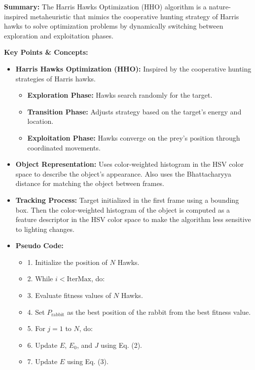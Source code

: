 \documentclass{article}
\begin{document}
\vspace{0.3cm}

\textbf{Summary:} The Harris Hawks Optimization (HHO) algorithm is a nature-inspired metaheuristic that mimics the cooperative hunting strategy of Harris hawks to solve optimization problems by dynamically switching between exploration and exploitation phases.

\vspace{0.3cm}

\textbf{Key Points \& Concepts:}
\begin{itemize}
  \item \textbf{Harris Hawks Optimization (HHO):} Inspired by the cooperative hunting strategies of Harris hawks.
    \begin{itemize}
      \item \textbf{Exploration Phase:} Hawks search randomly for the target.
      \item \textbf{Transition Phase:} Adjusts strategy based on the target's energy and location.
      \item \textbf{Exploitation Phase:} Hawks converge on the prey's position through coordinated movements.
    \end{itemize}
  \item \textbf{Object Representation:} Uses color-weighted histogram in the HSV color space to describe the object's appearance. Also uses the Bhattacharyya distance for matching the object between frames.
  \item \textbf{Tracking Process:} Target initialized in the first frame using a bounding box. Then the color-weighted histogram of the object is computed as a feature descriptor in the HSV color space to make the algorithm less sensitive to lighting changes. 
  \item \textbf{Pseudo Code:}
    \begin{itemize}
      \item 1. Initialize the position of \(N\) Hawks. 
      \item 2. While \(i < \text{IterMax}\), do:
      \item 3. Evaluate fitness values of \(N\) Hawks.
      \item 4. Set \(P_{\text{rabbit}}\) as the best position of the rabbit from the best fitness value.  
      \item 5. For \(j = 1\) to \(N\), do: 
      \item 6. Update \(E\), \(E_0\), and \(J\) using Eq. (2).  
      \item 7. Update \(E\) using Eq. (3).  

\end{itemize}
\end{itemize}
\end{document}

